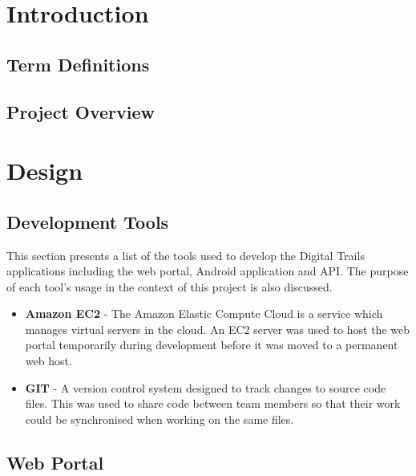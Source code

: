 \documentclass[11pt,a4paper]{report}
\begin{document}


\newpage
\setcounter{secnumdepth}{4}
\setcounter{page}{1}
\tableofcontents

\newpage
\setcounter{page}{1}
\chapter*{Introduction}

\label{sec:introduction}
\section{Term Definitions}
\label{sec:term-definitions}
\section{Project Overview}
\label{sec:project-overview}

\chapter{Design}
\label{sec:design}

\section{Development Tools}

This section presents a list of the tools used to develop the Digital Trails applications including the web portal, Android application and API. The purpose of each tool's usage in the context of this project is also discussed.

\begin{itemize}

\item \textbf{Amazon EC2} - The Amazon Elastic Compute Cloud is a service which manages virtual servers in the cloud. An EC2 server was used to host the web portal temporarily during development before it was moved to a permanent web host.

\item \textbf{GIT} - A version control system designed to track changes to source code files. This was used to share code between team members so that their work could be synchronised when working on the same files.

\end{itemize}

\section{Web Portal}
\label{sec:web-portal-design}
\end{document}

